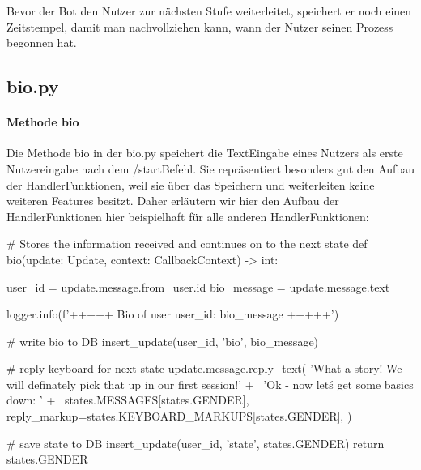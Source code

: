             Bevor der Bot den Nutzer zur nächsten Stufe weiterleitet, speichert er noch einen Zeitstempel, damit man nachvollziehen kann, wann der Nutzer seinen Prozess begonnen hat.


        \subsection{bio.py}
            \paragraph{Methode bio}
                Die Methode bio in der bio.py speichert die Text\-Eingabe eines Nutzers als erste Nutzereingabe nach dem /start\-Befehl. Sie repräsentiert besonders gut den Aufbau der Handler\-Funktionen, weil sie über das Speichern und weiterleiten keine weiteren Features besitzt. Daher erläutern wir hier den Aufbau der Handler\-Funktionen hier beispielhaft für alle anderen Handler\-Funktionen:

                \begin{pyverbatim} 

                # Stores the information received and continues on to the next state
                def bio(update: Update, context: CallbackContext) -> int:
                    
                    user_id = update.message.from_user.id
                    bio_message = update.message.text
                    
                    logger.info(f'+++++ Bio of user {user_id}: {bio_message} +++++')

                    # write bio to DB
                    insert_update(user_id, 'bio', bio_message)

                    # reply keyboard for next state
                    update.message.reply_text(
                        'What a story! We will definately pick that up in our first session!\n\n' + \
                        'Ok - now let\'s get some basics down: \n' + \
                        states.MESSAGES[states.GENDER],
                        reply_markup=states.KEYBOARD_MARKUPS[states.GENDER],
                        )

                    # save state to DB
                    insert_update(user_id, 'state', states.GENDER)
                    return states.GENDER
                
                \end{pyverbatim} 

